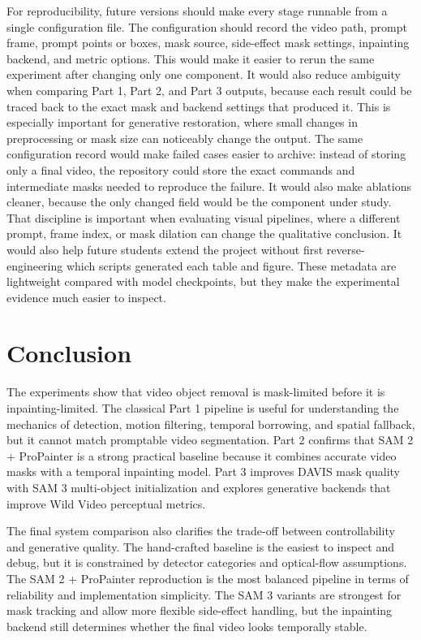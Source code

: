\documentclass[10pt,twocolumn,letterpaper]{article}
\begin{document}
For reproducibility, future versions should make every stage runnable from a single configuration file. The configuration should record the video path, prompt frame, prompt points or boxes, mask source, side-effect mask settings, inpainting backend, and metric options. This would make it easier to rerun the same experiment after changing only one component. It would also reduce ambiguity when comparing Part 1, Part 2, and Part 3 outputs, because each result could be traced back to the exact mask and backend settings that produced it. This is especially important for generative restoration, where small changes in preprocessing or mask size can noticeably change the output. The same configuration record would make failed cases easier to archive: instead of storing only a final video, the repository could store the exact commands and intermediate masks needed to reproduce the failure. It would also make ablations cleaner, because the only changed field would be the component under study. That discipline is important when evaluating visual pipelines, where a different prompt, frame index, or mask dilation can change the qualitative conclusion. It would also help future students extend the project without first reverse-engineering which scripts generated each table and figure. These metadata are lightweight compared with model checkpoints, but they make the experimental evidence much easier to inspect.

\section{Conclusion}
The experiments show that video object removal is mask-limited before it is inpainting-limited. The classical Part 1 pipeline is useful for understanding the mechanics of detection, motion filtering, temporal borrowing, and spatial fallback, but it cannot match promptable video segmentation. Part 2 confirms that SAM 2 + ProPainter is a strong practical baseline because it combines accurate video masks with a temporal inpainting model. Part 3 improves DAVIS mask quality with SAM 3 multi-object initialization and explores generative backends that improve Wild Video perceptual metrics.

The final system comparison also clarifies the trade-off between controllability and generative quality. The hand-crafted baseline is the easiest to inspect and debug, but it is constrained by detector categories and optical-flow assumptions. The SAM 2 + ProPainter reproduction is the most balanced pipeline in terms of reliability and implementation simplicity. The SAM 3 variants are strongest for mask tracking and allow more flexible side-effect handling, but the inpainting backend still determines whether the final video looks temporally stable.
\end{document}
